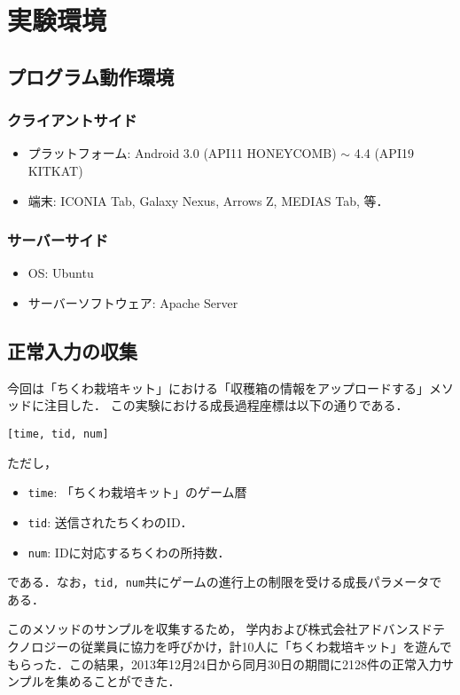 \section{実験環境}
\subsection{プログラム動作環境}
\subsubsection{クライアントサイド}
\begin{itemize}
\item
プラットフォーム: Android 3.0 (API11 HONEYCOMB) $\sim$ 4.4 (API19 KITKAT)
\item
端末: ICONIA Tab, Galaxy Nexus, Arrows Z, MEDIAS Tab, 等．
\end{itemize}

\subsubsection{サーバーサイド}
\begin{itemize}
\item
OS: Ubuntu
\item
サーバーソフトウェア: Apache Server
\end{itemize}

\subsection{正常入力の収集}
今回は「ちくわ栽培キット」における「収穫箱の情報をアップロードする」メソッドに注目した．
この実験における成長過程座標は以下の通りである．

\begin{center}
{\tt [time, tid, num]}
\end{center}

ただし，

\begin{itemize}
\item
{\tt time}: 「ちくわ栽培キット」のゲーム暦
\item
{\tt tid}: 送信されたちくわのID．
\item
{\tt num}: IDに対応するちくわの所持数．
\end{itemize}

である．なお，{\tt tid, num}共にゲームの進行上の制限を受ける成長パラメータである．

このメソッドのサンプルを収集するため，
学内および株式会社アドバンスドテクノロジーの従業員に協力を呼びかけ，計10人に「ちくわ栽培キット」を遊んでもらった．この結果，2013年12月24日から同月30日の期間に2128件の正常入力サンプルを集めることができた．

